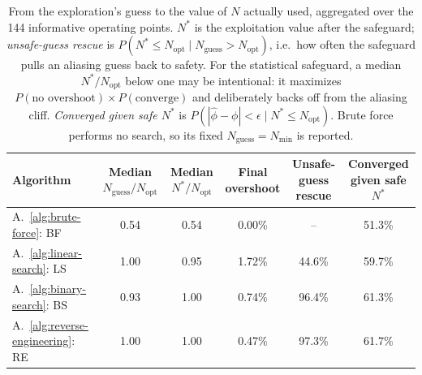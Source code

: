 \begin{table}[ht]
\centering
\small
\caption{From the exploration's guess to the value of $N$ actually used, aggregated over the 144 informative operating points. $N^*$ is the exploitation value after the safeguard; \emph{unsafe-guess rescue} is $P(N^* \le N_{\mathrm{opt}} \mid N_{\mathrm{guess}} > N_{\mathrm{opt}})$, i.e.\ how often the safeguard pulls an aliasing guess back to safety. For the statistical safeguard, a median $N^*/N_{\mathrm{opt}}$ below one may be intentional: it maximizes $P(\text{no overshoot})\times P(\text{converge})$ and deliberately backs off from the aliasing cliff. \emph{Converged given safe $N^*$} is $P(|\hat\phi-\phi|<\epsilon\mid N^*\leq N_{\mathrm{opt}})$. Brute force performs no search, so its fixed $N_{\mathrm{guess}}=N_{\min}$ is reported.}
\label{tab:diag-downstream}
\begin{tabular}{lccccc}
\toprule
Algorithm
& \makecell{Median \\ $N_{\mathrm{guess}}/N_{\mathrm{opt}}$}
& \makecell{Median \\ $N^*/N_{\mathrm{opt}}$}
& \makecell{Final \\ overshoot}
& \makecell{Unsafe-guess \\ rescue}
& \makecell{Converged \\ given safe $N^*$} \\
\midrule
A.~\ref{alg:brute-force}: BF
& 0.54
& 0.54
& 0.00\%
& --
& 51.3\% \\
A.~\ref{alg:linear-search}: LS
& 1.00
& 0.95
& 1.72\%
& 44.6\%
& 59.7\% \\
A.~\ref{alg:binary-search}: BS
& 0.93
& 1.00
& 0.74\%
& 96.4\%
& 61.3\% \\
A.~\ref{alg:reverse-engineering}: RE
& 1.00
& 1.00
& 0.47\%
& 97.3\%
& 61.7\% \\
\bottomrule
\end{tabular}
\end{table}
